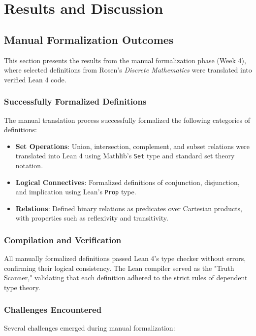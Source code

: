 \chapter{Results and Discussion}
\label{chap:Four}

\section{Manual Formalization Outcomes}
\label{sec:manual-results}

This section presents the results from the manual formalization phase (Week 4), where selected definitions from Rosen's \textit{Discrete Mathematics} were translated into verified Lean 4 code.

\subsection{Successfully Formalized Definitions}
The manual translation process successfully formalized the following categories of definitions:

\begin{itemize}
    \item \textbf{Set Operations}: Union, intersection, complement, and subset relations were translated into Lean 4 using Mathlib's \texttt{Set} type and standard set theory notation.
    \item \textbf{Logical Connectives}: Formalized definitions of conjunction, disjunction, and implication using Lean's \texttt{Prop} type.
    \item \textbf{Relations}: Defined binary relations as predicates over Cartesian products, with properties such as reflexivity and transitivity.
\end{itemize}

\subsection{Compilation and Verification}
All manually formalized definitions passed Lean 4's type checker without errors, confirming their logical consistency. The Lean compiler served as the "Truth Scanner," validating that each definition adhered to the strict rules of dependent type theory.

\subsection{Challenges Encountered}
Several challenges emerged during manual formalization:

